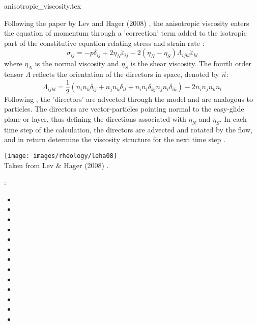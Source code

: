 \begin{flushright} {\tiny {\color{gray} anisotropic\_viscosity.tex}} \end{flushright}



Following the paper by Lev and Hager (2008) \cite{leha08}, 
the anisotropic viscosity enters the equation of momentum through a 'correction'
term added to the isotropic part of the constitutive equation relating
stress and strain rate \cite{mumh02}:
\[
\sigma_{ij} = -p \delta_{ij} + 2 \eta_N \dot{\varepsilon}_{ij}  - 2(\eta_N-\eta_S)\Lambda_{ijkl}\dot{\varepsilon}_{kl} 
\]
where $\eta_N$ is the normal viscosity and $\eta_S$ is the shear viscosity. 
The fourth order tensor $\Lambda$ reflects the orientation of the directors in space, 
denoted by $\vec{n}$:
\[
\Lambda_{ijkl}=\frac{1}{2} (n_i n_k \delta_{lj} + n_j n_k \delta_{il} 
+ n_i n_l \delta_{kj} n_j n_l \delta_{ik} )
- 2 n_i n_j n_k n_l 
\]
Following \cite{modm03,mumh02}, the 'directors' are advected through the model and are 
analogous to particles. The directors are
vector-particles pointing normal to the easy-glide plane or layer,
thus defining the directions associated with $\eta_N$ and $\eta_S$. 
In each time step of the calculation, the directors are advected and rotated by the
flow, and in return determine the viscosity structure for the next time
step \cite{mumc04}.

\begin{center}
\texttt{[image: images/rheology/leha08]}\\
{\captionfont Taken from Lev \& Hager (2008) \cite{leha08}.}
\end{center}


{\scriptsize
\Literature:
\begin{itemize}
\item 
{}
\item 
{}
\item 
{}
\item 
{}
\item 
{}
\item 
{}
\item 
{}
\item 
{}
\item 
{}
\item 
{}
\item 
{}
\item 
{}
\item 
{}
\end{itemize}
}







